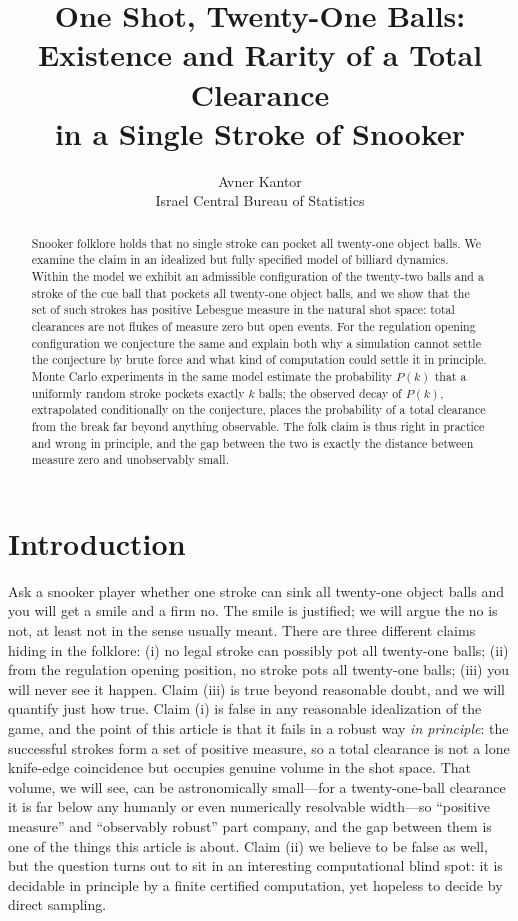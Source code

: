 \documentclass[11pt]{article}
\title{One Shot, Twenty-One Balls:\\
Existence and Rarity of a Total Clearance\\
in a Single Stroke of Snooker}
\author{Avner Kantor\\[2pt]
\small Israel Central Bureau of Statistics}
\date{}
\theoremstyle{definition}
\theoremstyle{remark}
\begin{document}
\maketitle

\begin{abstract}
Snooker folklore holds that no single stroke can pocket all
twenty-one object balls. We examine the claim in an idealized but
fully specified model of billiard dynamics. Within the model we
exhibit an admissible configuration of the twenty-two balls and a
stroke of the cue ball that pockets all twenty-one object balls, and
we show that the set of such strokes has positive Lebesgue measure in
the natural shot space: total clearances are not flukes of measure
zero but open events. For the regulation opening configuration we
conjecture the same and explain both why a simulation cannot settle
the conjecture by brute force and what kind of computation could
settle it in principle. Monte Carlo experiments in the same model
estimate the probability $P(k)$ that a uniformly random stroke
pockets exactly $k$ balls; the observed decay of $P(k)$, extrapolated
conditionally on the conjecture, places the probability of a total
clearance from the break far beyond anything observable. The folk
claim is thus right in practice and wrong in principle, and the gap
between the two is exactly the distance between measure zero and
unobservably small.
\end{abstract}

\section{Introduction}

Ask a snooker player whether one stroke can sink all twenty-one
object balls and you will get a smile and a firm no. The smile is
justified; we will argue the no is not, at least not in the sense
usually meant. There are three different claims hiding in the
folklore:
(i) no legal stroke can possibly pot all twenty-one balls;
(ii) from the regulation opening position, no stroke pots all
twenty-one balls;
(iii) you will never see it happen.
Claim (iii) is true beyond reasonable doubt, and we will quantify
just how true. Claim (i) is false in any reasonable idealization of
the game, and the point of this article is that it fails in a robust
way \emph{in principle}: the successful strokes form a set of
positive measure, so a total clearance is not a lone knife-edge
coincidence but occupies genuine volume in the shot space. That
volume, we will see, can be astronomically small---for a
twenty-one-ball clearance it is far below any humanly or even
numerically resolvable width---so ``positive measure'' and
``observably robust'' part company, and the gap between them is one of
the things this article is about. Claim (ii) we
believe to be false as well, but the question turns out to sit in an
interesting computational blind spot: it is decidable in principle by
a finite certified computation, yet hopeless to decide by direct
sampling.
\end{document}
